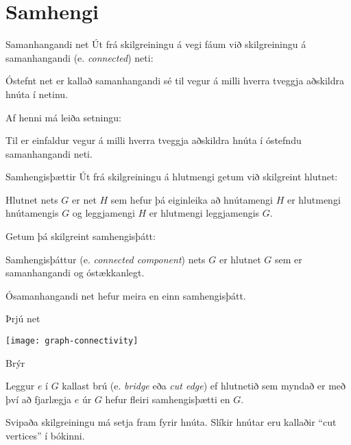 \documentclass{beamer}
\begin{document}
\section{Samhengi}

\begin{frame}{Samanhangandi net}
Út frá skilgreiningu á vegi fáum við skilgreiningu á samanhangandi (e. \emph{connected}) neti:
\begin{tcolorbox}[title=Samanhangandi net]
Óstefnt net er kallað samanhangandi sé til vegur á milli hverra tveggja aðskildra hnúta í netinu.
\end{tcolorbox}
Af henni má leiða setningu:
\begin{tcolorbox}
Til er einfaldur vegur á milli hverra tveggja aðskildra hnúta í óstefndu samanhangandi neti.
\end{tcolorbox}

\end{frame}

\begin{frame}{Samhengisþættir}
Út frá skilgreiningu á hlutmengi getum við skilgreint hlutnet:
\begin{tcolorbox}[title=Hlutnet]
Hlutnet nets $G$ er net $H$ sem hefur þá eiginleika að hnútamengi $H$ er hlutmengi hnútamengis $G$ og leggjamengi $H$ er hlutmengi leggjamengis $G$.
\end{tcolorbox}
Getum þá skilgreint samhengisþátt:
\begin{tcolorbox}
Samhengisþáttur (e. \emph{connected component}) nets $G$ er hlutnet $G$ sem er samanhangandi og óstækkanlegt.
\end{tcolorbox}
Ósamanhangandi net hefur meira en einn samhengisþátt.
\end{frame}

\begin{frame}{Þrjú net}
\begin{center}
\texttt{[image: graph-connectivity]}
\end{center}
\end{frame}

\begin{frame}{Brýr}
\begin{tcolorbox}[title=Brú]
Leggur $e$ í $G$ kallast brú (e. \emph{bridge} eða \emph{cut edge}) ef hlutnetið sem myndað er með því að fjarlægja $e$ úr $G$ hefur fleiri samhengisþætti en $G$.
\end{tcolorbox}
Svipaða skilgreiningu má setja fram fyrir hnúta. Slíkir hnútar eru kallaðir ``cut vertices'' í bókinni.
\end{frame}
\end{document}
